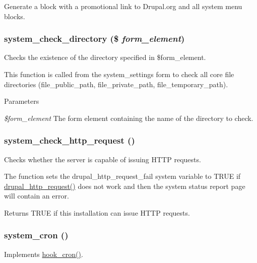 Generate a block with a promotional link to Drupal.org and all system menu blocks. \hypertarget{system_8module_ab2199f53b5eed000b9722bb6de83f57f}{
\subsubsection[{system\_\-check\_\-directory}]{\setlength{\rightskip}{0pt plus 5cm}system\_\-check\_\-directory (\$ {\em form\_\-element})}}
\label{system_8module_ab2199f53b5eed000b9722bb6de83f57f}
Checks the existence of the directory specified in \$form\_\-element.

This function is called from the system\_\-settings form to check all core file directories (file\_\-public\_\-path, file\_\-private\_\-path, file\_\-temporary\_\-path).


\begin{DoxyParams}{Parameters}
\item[{\em \$form\_\-element}]The form element containing the name of the directory to check. \end{DoxyParams}
\hypertarget{system_8module_ac762dd5b169e5f48a3cb96f08be8c067}{
\subsubsection[{system\_\-check\_\-http\_\-request}]{\setlength{\rightskip}{0pt plus 5cm}system\_\-check\_\-http\_\-request ()}}
\label{system_8module_ac762dd5b169e5f48a3cb96f08be8c067}
Checks whether the server is capable of issuing HTTP requests.

The function sets the drupal\_\-http\_\-request\_\-fail system variable to TRUE if \hyperlink{group__http__handling_gaad3affacd718b960300dcdddefa518aa}{drupal\_\-http\_\-request()} does not work and then the system status report page will contain an error.

\begin{DoxyReturn}{Returns}
TRUE if this installation can issue HTTP requests. 
\end{DoxyReturn}
\hypertarget{system_8module_aaf72e35b8cb67cfe762abe4132f84c3f}{
\subsubsection[{system\_\-cron}]{\setlength{\rightskip}{0pt plus 5cm}system\_\-cron ()}}
\label{system_8module_aaf72e35b8cb67cfe762abe4132f84c3f}
Implements \hyperlink{group__hooks_gaf07f1e3d98112fc2ba6920cf7ee6fb16}{hook\_\-cron()}.

